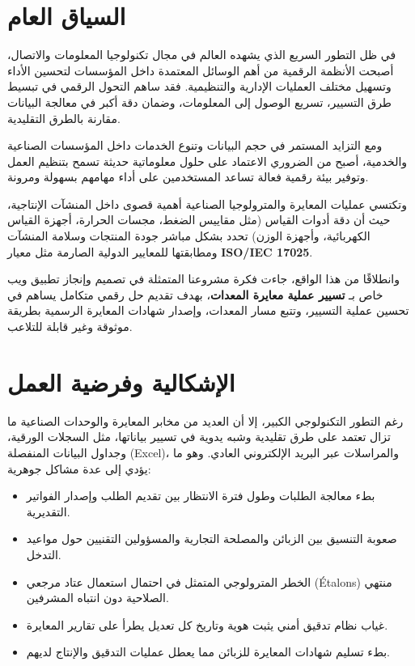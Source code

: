 \documentclass{bts-report-ar}
\begin{document}
\setcounter{page}{1}


\section*{السياق العام}
في ظل التطور السريع الذي يشهده العالم في مجال تكنولوجيا المعلومات والاتصال، أصبحت الأنظمة الرقمية من أهم الوسائل المعتمدة داخل المؤسسات لتحسين الأداء وتسهيل مختلف العمليات الإدارية والتنظيمية. فقد ساهم التحول الرقمي في تبسيط طرق التسيير، تسريع الوصول إلى المعلومات، وضمان دقة أكبر في معالجة البيانات مقارنة بالطرق التقليدية.

ومع التزايد المستمر في حجم البيانات وتنوع الخدمات داخل المؤسسات الصناعية والخدمية، أصبح من الضروري الاعتماد على حلول معلوماتية حديثة تسمح بتنظيم العمل وتوفير بيئة رقمية فعالة تساعد المستخدمين على أداء مهامهم بسهولة ومرونة.

وتكتسي عمليات المعايرة والمترولوجيا الصناعية أهمية قصوى داخل المنشآت الإنتاجية، حيث أن دقة أدوات القياس (مثل مقاييس الضغط، مجسات الحرارة، أجهزة القياس الكهربائية، وأجهزة الوزن) تحدد بشكل مباشر جودة المنتجات وسلامة المنشآت ومطابقتها للمعايير الدولية الصارمة مثل معيار \textbf{ISO/IEC 17025}. 

وانطلاقًا من هذا الواقع، جاءت فكرة مشروعنا المتمثلة في تصميم وإنجاز تطبيق ويب خاص بـ \textbf{تسيير عملية معايرة المعدات}، بهدف تقديم حل رقمي متكامل يساهم في تحسين عملية التسيير، وتتبع مسار المعدات، وإصدار شهادات المعايرة الرسمية بطريقة موثوقة وغير قابلة للتلاعب.

\section*{الإشكالية وفرضية العمل}
رغم التطور التكنولوجي الكبير، إلا أن العديد من مخابر المعايرة والوحدات الصناعية ما تزال تعتمد على طرق تقليدية وشبه يدوية في تسيير بياناتها، مثل السجلات الورقية، وجداول البيانات المنفصلة (Excel)، والمراسلات عبر البريد الإلكتروني العادي. وهو ما يؤدي إلى عدة مشاكل جوهرية:
\begin{itemize}
  \item بطء معالجة الطلبات وطول فترة الانتظار بين تقديم الطلب وإصدار الفواتير التقديرية.
  \item صعوبة التنسيق بين الزبائن والمصلحة التجارية والمسؤولين التقنيين حول مواعيد التدخل.
  \item الخطر المترولوجي المتمثل في احتمال استعمال عتاد مرجعي (Étalons) منتهي الصلاحية دون انتباه المشرفين.
  \item غياب نظام تدقيق أمني يثبت هوية وتاريخ كل تعديل يطرأ على تقارير المعايرة.
  \item بطء تسليم شهادات المعايرة للزبائن مما يعطل عمليات التدقيق والإنتاج لديهم.
\end{itemize}
\end{document}
